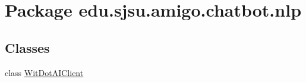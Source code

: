 \hypertarget{namespaceedu_1_1sjsu_1_1amigo_1_1chatbot_1_1nlp}{}\section{Package edu.\+sjsu.\+amigo.\+chatbot.\+nlp}
\label{namespaceedu_1_1sjsu_1_1amigo_1_1chatbot_1_1nlp}
\subsection*{Classes}
\begin{DoxyCompactItemize}
\item 
class \hyperlink{classedu_1_1sjsu_1_1amigo_1_1chatbot_1_1nlp_1_1_wit_dot_a_i_client}{Wit\+Dot\+A\+I\+Client}
\end{DoxyCompactItemize}
